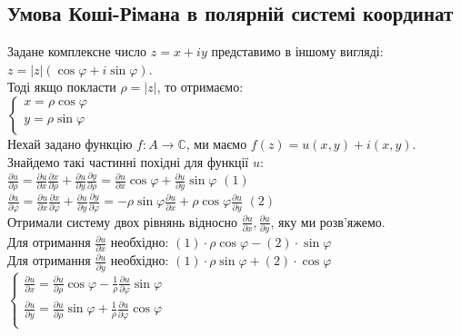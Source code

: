 \documentclass{math_library}
\begin{document}
\subsection{Умова Коші-Рімана в полярній системі координат}
Задане комплексне число $z=x+iy$ представимо в іншому вигляді:\\
$z=|z|(\cos \varphi + i \sin \varphi)$.\\
Тоді якщо покласти $\rho = |z|$, то отримаємо:
\\$\begin{cases}
\displaystyle x = \rho \cos \varphi \\
\displaystyle y = \rho \sin \varphi \\
\end{cases}$\\
Нехай задано функцію $f: A \to \mathbb{C}$, ми маємо $f(z) = u(x,y) + i(x,y)$.\\
Знайдемо такі частинні похідні для функції $u$:\\
$\displaystyle\frac{\partial u}{\partial \rho} = \frac{\partial u}{\partial x}\frac{\partial x}{\partial \rho}+\frac{\partial u}{\partial y}\frac{\partial y}{\partial \rho} = \frac{\partial u}{\partial x} \cos \varphi+\frac{\partial u}{\partial y} \sin \varphi$ $(1)$\\
$\displaystyle\frac{\partial u}{\partial \varphi} = \frac{\partial u}{\partial x}\frac{\partial x}{\partial \varphi}+\frac{\partial u}{\partial y}\frac{\partial y}{\partial \varphi} = -\rho \sin \varphi\frac{\partial u}{\partial x} + \rho \cos \varphi \frac{\partial u}{\partial y}$ $(2)$\\
Отримали систему двох рівнянь відносно $\displaystyle \frac{\partial u}{\partial x}, \frac{\partial u}{\partial y}$, яку ми розв'яжемо.\\
Для отримання $\displaystyle \frac{\partial u}{\partial x}$ необхідно: $(1)\cdot \rho \cos \varphi - (2)\cdot \sin \varphi$\\
Для отримання $\displaystyle \frac{\partial u}{\partial y}$ необхідно: $(1)\cdot \rho \sin \varphi + (2)\cdot \cos \varphi$\\
$\begin{cases}
\displaystyle \frac{\partial u}{\partial x} = \displaystyle \frac{\partial u}{\partial \rho} \cos \varphi - \frac{1}{\rho} \frac{\partial u}{\partial \varphi} \sin \varphi\\
\displaystyle \frac{\partial u}{\partial y} = \displaystyle \frac{\partial u}{\partial \rho} \sin \varphi + \frac{1}{\rho} \frac{\partial u}{\partial \varphi} \cos \varphi\\
\end{cases}$\\
\end{document}
